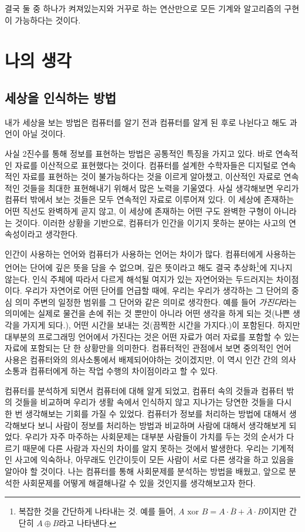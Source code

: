 \documentclass{article}
\begin{document}
결국 둘 중 하나가 켜져있는지와 거꾸로 하는 연산만으로
모든 기계와 알고리즘의 구현이 가능하다는 것이다.

\section{나의 생각}

\subsection{세상을 인식하는 방법}

내가 세상을 보는 방법은 컴퓨터를 알기 전과 컴퓨터를 알게 된 후로 나뉜다고 해도 과언이 아닐 것이다.

사실 2진수를 통해 정보를 표현하는 방법은 공통적인 특징을 가지고 있다.
바로 연속적인 자료를 이산적으로 표현했다는 것이다.
컴퓨터를 설계한 수학자들은 디지털로 연속적인 자료를 표현하는 것이 불가능하다는 것을 이르게 알아챘고,
이산적인 자료로 연속적인 것들을 최대한 표현해내기 위해서 많은 노력을 기울였다.
사실 생각해보면 우리가 컴퓨터 밖에서 보는 것들은 모두 연속적인 자료로 이루어져 있다.
이 세상에 존재하는 어떤 직선도 완벽하게 곧지 않고,
이 세상에 존재하는 어떤 구도 완벽한 구형이 아니라는 것이다.
이러한 상황을 기반으로,
컴퓨터가 인간을 이기지 못하는 분야는 사고의 연속성이라고 생각한다.

인간이 사용하는 언어와 컴퓨터가 사용하는 언어는 차이가 많다.
컴퓨터에게 사용하는 언어는 단어에 깊은 뜻을 담을 수 없으며, 깊은 뜻이라고 해도 결국
추상화\footnote{복잡한 것을 간단하게 나타내는 것. 예를 들어,
$A \text{ xor } B = A \cdot \overline B + \overline A \cdot B$이지만
간단히 $A \oplus B$라고 나타낸다.}에 지나지 않는다.
인식 주체에 따라서 다르게 해석될 여지가 있는 자연어와는 두드러지는 차이점이다.
우리가 자연어로 어떤 단어를 언급할 때에, 우리는 우리가 생각하는 그 단어의 중심 의미 주변의 일정한
범위를 그 단어와 같은 의미로 생각한다. 예를 들어 \textit{가진다}라는 의미에는 실제로 물건을 손에 쥐는 것
뿐만이 아니라 어떤 생각을 하게 되는 것(나쁜 생각을 가지게 되다.),
어떤 시간을 보내는 것(끔찍한 시간을 가지다.)이 포함된다.
하지만 대부분의 프로그래밍 언어에서 가진다는 것은 어떤 자료가 여러 자료를 포함할 수 있는 자료에
포함되는 단 한 상황만을 의미한다.
컴퓨터적인 관점에서 보면 중의적인 언어 사용은 컴퓨터와의 의사소통에서 배제되어야하는 것이겠지만,
이 역시 인간 간의 의사소통과 컴퓨터에게 하는 작업 수행의 차이점이라고 할 수 있다.

컴퓨터를 분석하게 되면서 컴퓨터에 대해 알게 되었고, 컴퓨터 속의 것들과 컴퓨터 밖의 것들을 비교하며
우리가 생활 속에서 인식하지 않고 지나가는 당연한 것들을 다시 한 번 생각해보는 기회를 가질 수
있었다.
컴퓨터가 정보를 처리하는 방법에 대해서 생각해보다 보니 사람이 정보를 처리하는 방법과
비교하며 사람에 대해서 생각해보게 되었다.
우리가 자주 마주하는 사회문제는 대부분 사람들이 가치를 두는 것의 순서가 다르기 때문에
다른 사람과 자신의 차이를 알지 못하는 것에서 발생한다.
우리는 기계적인 사고에 익숙하나, 아무래도 인간이듯이 모든 사람이 서로 다른 생각을 하고 있음을
알아야 할 것이다.
나는 컴퓨터를 통해 사회문제를 분석하는 방법을 배웠고, 앞으로 분석한 사회문제를 어떻게 해결해나갈
수 있을 것인지를 생각해보고자 한다.
\end{document}
